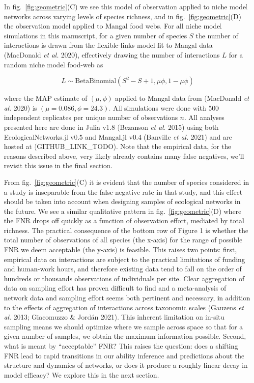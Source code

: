 \documentclass[11pt]{article}
\begin{document}
In fig.~\ref{fig:geometric}(C) we see this model of observation applied
to niche model networks across varying levels of species richness, and
in fig.~\ref{fig:geometric}(D) the observation model applied to Mangal
food webs. For all niche model simulations in this manuscript, for a
given number of species \(S\) the number of interactions is drawn from
the flexible-links model fit to Mangal data (MacDonald \emph{et al.}
2020), effectively drawing the number of interactions \(L\) for a random
niche model food-web as

\[L \sim  \text{BetaBinomial}(S^2-S+1,\mu\phi, 1-\mu\phi)\]

where the MAP estimate of \((\mu, \phi)\) applied to Mangal data from
(MacDonald \emph{et al.} 2020) is \((\mu=0.086, \phi=24.3)\). All
simulations were done with 500 independent replicates per unique number
of observations \(n\). All analyses presented here are done in Julia
v1.8 (Bezanson \emph{et al.} 2015) using both EcologicalNetworks.jl v0.5
and Mangal.jl v0.4 (Banville \emph{et al.} 2021) and are hosted at
(GITHUB\_LINK\_TODO). Note that the empirical data, for the reasons
described above, very likely already contains many false negatives,
we'll revisit this issue in the final section.

From fig.~\ref{fig:geometric}(C) it is evident that the number of
species considered in a study is inseparable from the false-negative
rate in that study, and this effect should be taken into account when
designing samples of ecological networks in the future. We see a similar
qualitative pattern in fig.~\ref{fig:geometric}(D) where the FNR drops
off quickly as a function of observation effort, mediated by total
richness. The practical consequence of the bottom row of Figure 1 is
whether the total number of observations of all species (the x-axis) for
the range of possible FNR we deem acceptable (the y-axis) is feasible.
This raises two points: first, empirical data on interactions are
subject to the practical limitations of funding and human-work hours,
and therefore existing data tend to fall on the order of hundreds or
thousands observations of individuals per site. Clear aggregation of
data on sampling effort has proven difficult to find and a meta-analysis
of network data and sampling effort seems both pertinent and necessary,
in addition to the effects of aggregation of interactions across
taxonomic scales (Gauzens \emph{et al.} 2013; Giacomuzzo \& Jordán
2021). This inherent limitation on in-situ sampling means we should
optimize where we sample across space so that for a given number of
samples, we obtain the maximum information possible. Second, what is
meant by ``acceptable'' FNR? This raises the question: does a shifting
FNR lead to rapid transitions in our ability inference and predictions
about the structure and dynamics of networks, or does it produce a
roughly linear decay in model efficacy? We explore this in the next
section.
\end{document}
